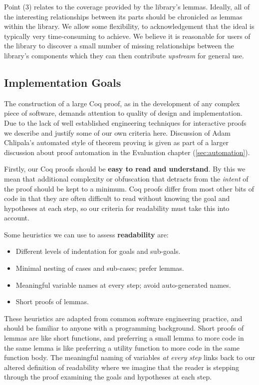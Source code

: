 \documentclass[]{unswthesis}
\let\i\textit
\let\b\textbf
\begin{document}
Point (3) relates to the coverage provided by the library's lemmas. Ideally, all of the interesting relationships between its parts should be chronicled as lemmas within the library. We allow some flexibility, to acknowledgement that the ideal is typically very time-consuming to achieve. We believe it is reasonable for users of the library to discover a small number of missing relationships between the library's components which they can then contribute \i{upstream} for general use.

\subsection{Implementation Goals}
\label{sec:impl-goals}

The construction of a large Coq proof, as in the development of any complex piece of software, demands attention to quality of design and implementation. Due to the lack of well established engineering techniques for interactive proofs we describe and justify some of our own criteria here. Discussion of Adam Chlipala's automated style of theorem proving is given as part of a larger discussion about proof automation in the Evaluation chapter (\cref{sec:automation}).

Firstly, our Coq proofs should be \b{easy to read and understand}. By this we mean that additional complexity or obfuscation that detracts from the \i{intent} of the proof should be kept to a minimum. Coq proofs differ from most other bits of code in that they are often difficult to read without knowing the goal and hypotheses at each step, so our criteria for readability must take this into account.

Some heuristics we can use to assess \b{readability} are:

\begin{itemize}
\item Different levels of indentation for goals and sub-goals.
\item Minimal nesting of cases and sub-cases; prefer lemmas.
\item Meaningful variable names at every step; avoid auto-generated names.
\item Short proofs of lemmas.
\end{itemize}

These heuristics are adapted from common software engineering practice, and should be familiar to anyone with a programming background. Short proofs of lemmas are like short functions, and preferring a small lemma to more code in the same lemma is like preferring a utility function to more code in the same function body. The meaningful naming of variables \i{at every step} links back to our altered definition of readability where we imagine that the reader is stepping through the proof examining the goals and hypotheses at each step.
\end{document}
